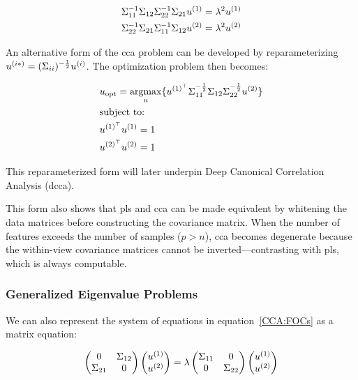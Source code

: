 \begin{align}
     & \Sigma_{11}^{-1}\Sigma_{12}\Sigma_{22}^{-1}\Sigma_{21}u^{(1)}=\lambda^2u^{(1)} \notag \\
     & \Sigma_{22}^{-1}\Sigma_{21}\Sigma_{11}^{-1}\Sigma_{12}u^{(2)}=\lambda^2u^{(2)} \notag
\end{align}

An alternative form of the \acrshort{cca} problem can be developed by reparameterizing \(u^{(i*)}=(\Sigma_{ii})^{-\frac{1}{2}}u^{(i)}\). The optimization problem then becomes:

\begin{align}
     & u_{\text{opt}}=\underset{u}{\mathrm{argmax}}\{ u^{(1)^{\top}}\Sigma_{11}^{-\frac{1}{2}}\Sigma_{12}\Sigma_{22}^{-\frac{1}{2}}u^{(2)} \} \\
     & \text{subject to:} \notag                                                                                                            \\
     & u^{(1)^{\top}}u^{(1)}=1 \notag                                                                                                         \\
     & u^{(2)^{\top}}u^{(2)}=1 \notag
\end{align}

This reparameterized form will later underpin Deep Canonical Correlation Analysis (\acrshort{dcca}).

This form also shows that \acrshort{pls} and \acrshort{cca} can be made equivalent by whitening the data matrices before constructing the covariance matrix. When the number of features exceeds the number of samples (\(p>n\)), \acrshort{cca} becomes degenerate because the within-view covariance matrices cannot be inverted—contrasting with \acrshort{pls}, which is always computable.

\subsubsection{Generalized Eigenvalue Problems}

We can also represent the system of equations in equation~\ref{CCA:FOCs} as a matrix equation:

\begin{align}
    \begin{pmatrix}
        0           & \Sigma_{12} \\
        \Sigma_{21} & 0
    \end{pmatrix}
    \begin{pmatrix}
        u^{(1)} \\
        u^{(2)}
    \end{pmatrix}
    =
    \lambda
    \begin{pmatrix}
        \Sigma_{11} & 0           \\
        0           & \Sigma_{22}
    \end{pmatrix}
    \begin{pmatrix}
        u^{(1)} \\
        u^{(2)}
    \end{pmatrix}
\end{align}

